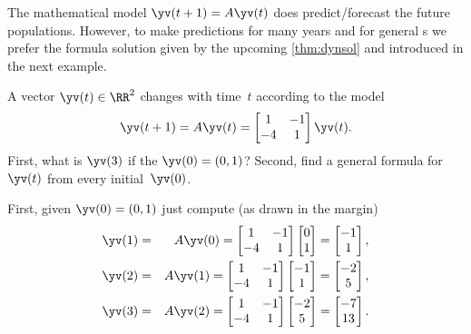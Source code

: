 The mathematical model \(\yv(t+1)=A\yv(t)\) does predict\slash forecast the future populations.
However, to make predictions for many years and for general s we prefer the formula solution given by the upcoming \autoref{thm:dynsol} and introduced in the next example.





\begin{example} \label{eg:2x2map}
A vector \(\yv(t)\in\RR^2\) changes with time~\(t\) according to the model
\begin{equation*}
\yv(t+1)=A\yv(t)=\begin{bmatrix} 1&-1\\-4&1 \end{bmatrix}\yv(t).
\end{equation*}
First, what is \(\yv(3)\) if the  \(\yv(0)=(0,1)\)?
Second, find a general formula for~\(\yv(t)\) from every initial~\(\yv(0)\).
\begin{solution} 
First, given \(\yv(0)=(0,1)\) just compute (as drawn in the margin)
%
\begin{eqnarray*}
\yv(1)&=&A\yv(0)=\begin{bmatrix} 1&-1\\-4&1 \end{bmatrix}
\begin{bmatrix} 0\\1 \end{bmatrix}
=\begin{bmatrix} -1\\1 \end{bmatrix},
\\\yv(2)&=&A\yv(1)=\begin{bmatrix} 1&-1\\-4&1 \end{bmatrix}
\begin{bmatrix} -1\\1 \end{bmatrix}
=\begin{bmatrix} -2\\5 \end{bmatrix},
\\\yv(3)&=&A\yv(2)=\begin{bmatrix} 1&-1\\-4&1 \end{bmatrix}
\begin{bmatrix} -2\\5 \end{bmatrix}
=\begin{bmatrix} -7\\13 \end{bmatrix}.
\end{eqnarray*}



\end{solution}
\end{example}
